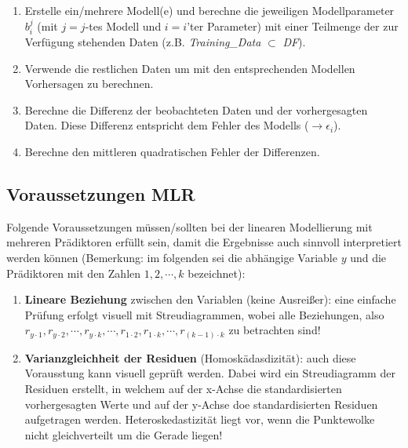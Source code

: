 \documentclass[]{article}
\providecommand{\tightlist}{%
  \setlength{\itemsep}{0pt}\setlength{\parskip}{0pt}}
\begin{document}
\begin{enumerate}
\def\labelenumi{\arabic{enumi}.}
\tightlist
\item
  Erstelle ein/mehrere Modell(e) und berechne die jeweiligen Modellparameter \(b_i^j\) (mit \(j = j\)-tes Modell und \(i = i\)'ter Parameter) mit einer Teilmenge der zur Verfügung stehenden Daten (z.B. \emph{Training\_Data} \(\subset\) \emph{DF}).
\item
  Verwende die restlichen Daten um mit den entsprechenden Modellen Vorhersagen zu berechnen.
\item
  Berechne die Differenz der beobachteten Daten und der vorhergesagten Daten. Diese Differenz entspricht dem Fehler des Modells (\(\rightarrow \epsilon_i\)).
\item
  Berechne den mittleren quadratischen Fehler der Differenzen.
\end{enumerate}

\hypertarget{voraussetzungen-mlr}{%
\subsection*{Voraussetzungen MLR}\label{voraussetzungen-mlr}}

Folgende Voraussetzungen müssen/sollten bei der linearen Modellierung mit mehreren Prädiktoren erfüllt sein, damit die Ergebnisse auch sinnvoll interpretiert werden können (Bemerkung: im folgenden sei die abhängige Variable \(y\) und die Prädiktoren mit den Zahlen \({1, 2, \cdots, k}\) bezeichnet):

\begin{enumerate}
\def\labelenumi{\arabic{enumi}.}
\tightlist
\item
  \textbf{Lineare Beziehung} zwischen den Variablen (keine Ausreißer): eine einfache Prüfung erfolgt visuell mit Streudiagrammen, wobei alle Beziehungen, also \(r_{y\cdot1}, r_{y\cdot2}, \cdots, r_{y\cdot k}, \cdots, r_{1\cdot2}, r_{1\cdot k}, \cdots, r_{(k-1)\cdot k}\) zu betrachten sind!
\item
  \textbf{Varianzgleichheit der Residuen} (Homoskädasdizität): auch diese Vorausstung kann visuell geprüft werden. Dabei wird ein Streudiagramm der Residuen erstellt, in welchem auf der x-Achse die standardisierten vorhergesagten Werte und auf der y-Achse doe standardisierten Residuen aufgetragen werden. Heteroskedastizität liegt vor, wenn die Punktewolke nicht gleichverteilt um die Gerade liegen!
\end{enumerate}
\end{document}
